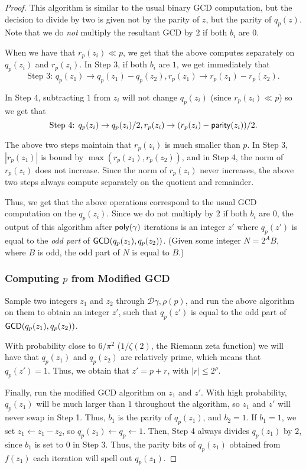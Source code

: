 \begin{proof}
This algorithm is similar to the usual binary GCD computation, but the decision to divide by two is given not by the parity of $z$, but the parity of $q_p(z)$. Note that we do \emph{not} multiply the resultant GCD by $2$ if both $b_i$ are $0$.

When we have that $r_p(z_i) \ll p$, we get that the above computes separately on $q_p(z_i)$ and $r_p(z_i)$. In Step 3, if both $b_i$ are $1$, we get immediately that
\[\text{Step 3: } q_p(z_1) \rightarrow q_p(z_1) - q_p(z_2), r_p(z_1) \rightarrow r_p(z_1) - r_p(z_2).\]

In Step 4, subtracting $1$ from $z_i$ will not change $q_p(z_i)$ (since $r_p(z_i) \ll p$) so we get that
\[\text{Step 4: } q_p(z_i) \rightarrow q_p(z_i) / 2, r_p(z_i) \rightarrow (r_p(z_i) - {\sf parity}(z_i)) / 2.\]

The above two steps maintain that $r_p(z_i)$ is much smaller than $p$. In Step 3, $|r_p(z_1)|$ is bound by $\max(r_p(z_1), r_p(z_2))$, and in Step 4, the norm of $r_p(z_i)$ does not increase. Since the norm of $r_p(z_i)$ never increases, the above two steps always compute separately on the quotient and remainder.

Thus, we get that the above operations correspond to the usual GCD computation on the $q_p(z_i)$. Since we do not multiply by $2$ if both $b_i$ are $0$, the output of this algorithm after ${\sf poly}(\gamma)$ iterations is an integer $z'$ where $q_p(z')$ is equal to the \emph{odd part} of ${\sf GCD}(q_p(z_1), q_p(z_2))$. (Given some integer $N = 2^A B$, where $B$ is odd, the odd part of $N$ is equal to $B$.)

\subsubsection{Computing $p$ from Modified GCD}

Sample two integers $z_1$ and $z_2$ through $\mathcal{D}{\gamma, \rho}(p)$, and run the above algorithm on them to obtain an integer $z'$, such that $q_p(z')$ is equal to the odd part of ${\sf GCD}(q_p(z_1), q_p(z_2))$.

With probability close to $6 / \pi^2$ ($1 / \zeta(2)$, the Riemann zeta function) we will have that $q_p(z_1)$ and $q_p(z_2)$ are relatively prime, which means that $q_p(z') = 1$. Thus, we obtain that $z' = p + r$, with $|r| \leq 2^\rho$.

Finally, run the modified GCD algorithm on $z_1$ and $z'$. With high probability, $q_p(z_1)$ will be much larger than $1$ throughout the algorithm, so $z_1$ and $z'$ will never swap in Step 1. Thus, $b_1$ is the parity of $q_p(z_1)$, and $b_2 = 1$. If $b_1 = 1$, we set $z_1 \leftarrow z_1 - z_2$, so $q_p(z_1) \leftarrow q_p \leftarrow 1$. Then, Step 4 always divides $q_p(z_1)$ by $2$, since $b_1$ is set to $0$ in Step 3. Thus, the parity bits of $q_p(z_1)$ obtained from $f(z_1)$ each iteration will spell out $q_p(z_1)$.


\end{proof}
